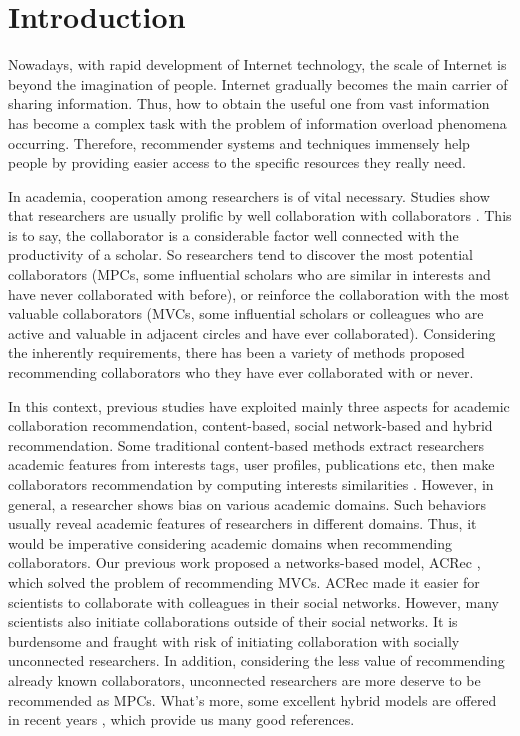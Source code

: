 \documentclass[review]{elsarticle}
\begin{document}
\section{Introduction}
Nowadays, with rapid development of Internet technology, the scale of Internet is beyond the imagination of people. Internet gradually becomes the main carrier of sharing information. Thus, how to obtain the useful one from vast information has become a complex task with the problem of information overload phenomena occurring. Therefore, recommender systems and techniques immensely help people by providing easier access to the specific resources they really need.

In academia, cooperation among researchers is of vital necessary. Studies show that researchers are usually prolific by well collaboration with collaborators \cite{lee2005impact}. This is to say, the collaborator is a considerable factor well connected with the productivity of a scholar. So researchers tend to discover the most potential collaborators (MPCs, some influential scholars who are similar in interests and have never collaborated with before), or reinforce the collaboration with the most valuable collaborators (MVCs, some influential scholars or colleagues who are active and valuable in adjacent circles and have ever collaborated). Considering the inherently requirements, there has been a variety of methods proposed recommending collaborators who they have ever collaborated with or never.

In this context, previous studies have exploited mainly three aspects for academic collaboration recommendation, content-based, social network-based and hybrid recommendation. Some traditional content-based methods extract researchers academic features from interests tags, user profiles, publications etc, then make collaborators recommendation by computing interests similarities \cite{lopes2010collaboration,gollapalli2012similar,kim2010collaborative}. However, in general, a researcher shows bias on various academic domains. Such behaviors usually reveal academic features of researchers in different domains. Thus, it would be imperative considering academic domains when recommending collaborators. Our previous work proposed a networks-based model, ACRec \cite{li2014acrec}, which solved the problem of recommending MVCs. ACRec made it easier for scientists to collaborate with colleagues in their social networks. However, many scientists also initiate collaborations outside of their social networks. It is burdensome and fraught with risk of initiating collaboration with socially unconnected researchers. In addition, considering the less value of recommending already known collaborators, unconnected researchers are more deserve to be recommended as MPCs. What's more, some excellent hybrid models are offered in recent years \cite{lee2011recommending,chen2011collabseer,cohen2013recommending}, which provide us many good references.
\end{document}
